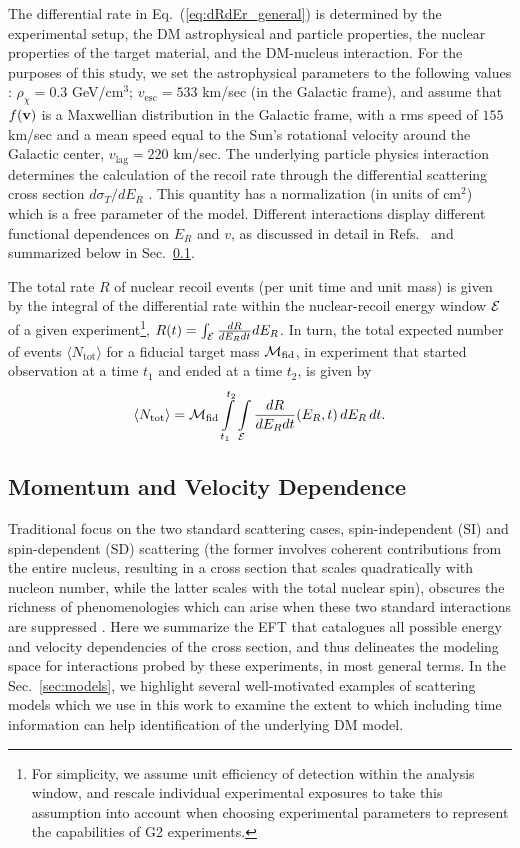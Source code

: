 \documentclass[11pt]{article}
\newcommand{\beq}{\begin{equation}} \newcommand{\eeq}{\end{equation}}
\newcommand{\Eq}[1]{Eq.~(\ref{#1})} \newcommand{\Eqs}[2]{Eqs.~(\ref{#1}) and (\ref{#2})} \newcommand{\Eqm}[2]{Eqs.~(\ref{#1}) through (\ref{#2})}
\newcommand{\Sec}[1]{Sec.~\ref{#1}} \newcommand{\Secs}[2]{Secs.~\ref{#1} and \ref{#2}} \newcommand{\Secm}[2]{Secs.~\ref{#1} through \ref{#2}}
\begin{document}
The differential rate in \Eq{eq:dRdEr_general} is determined by the experimental setup, the DM astrophysical and particle properties, the nuclear properties of the target material, and the DM-nucleus interaction. For the purposes of this study, we set the astrophysical parameters to the following values \cite{Bovy:2013raa,Piffl:2013mla}: $\rho_\chi=0.3$ GeV/cm$^3$; $v_{\mathrm{esc}} = 533$ km/sec (in the Galactic frame), and assume that $f(\mathrm{\mbox{\bf{v}}})$ is a Maxwellian distribution in the Galactic frame, with a rms speed of $155$ km/sec and a mean speed equal to the Sun's rotational velocity around the Galactic center, $v_\textrm{lag}=220$ km/sec.
The underlying particle physics interaction determines the calculation of the recoil rate through the differential scattering cross section ${d\sigma_T}/{dE_R}$ \cite{Gluscevic:2015sqa,Gresham:2014vja}. This quantity has a normalization (in units of cm${}^2$) which is a free parameter of the model. Different interactions display different functional dependences on $E_R$ and $v$, as discussed in detail in Refs.~\cite{Gluscevic:2015sqa,Gresham:2014vja} and summarized below in \Sec{subsec:momentum_velocity}.

The total rate $R$ of nuclear recoil events (per unit time and unit mass) is given by the integral of the differential rate within the nuclear-recoil energy window ${\cal E}$ of a given experiment\footnote{For simplicity, we assume unit efficiency of detection within the analysis window, and rescale individual experimental exposures to take this assumption into account when choosing experimental parameters to represent the capabilities of G2 experiments.}, $R(t)=\int_{\cal E} \frac{dR}{dE_R dt} dE_R$. In turn, the total expected number of events $\langle N_\mathrm{tot}\rangle$ for a fiducial target mass ${\cal M}_\textrm{fid}$, in experiment that started observation at a time $t_1$ and ended at a time $t_2$, is given by
\beq \label{eq:totevents}
\langle N_\mathrm{tot}\rangle =  \cM_\textrm{fid} \int\limits_{t_1}^{t_2} \int\limits_\cE  \frac{dR}{dE_R dt}(E_R,t)\,dE_R \,dt.
\eeq


\subsection{Momentum and Velocity Dependence}
\label{subsec:momentum_velocity}

Traditional focus on the two standard scattering cases, spin-independent (SI) and spin-dependent (SD) scattering (the former involves coherent contributions from the entire nucleus, resulting in a cross section that scales quadratically with nucleon number, while the latter scales with the total nuclear spin), obscures the richness of phenomenologies which can arise when these two standard interactions are suppressed \cite{Fitzpatrick:2012ix,Gresham:2014vja}. Here we summarize the EFT that catalogues all possible energy and velocity dependencies of the cross section, and thus delineates the modeling space for interactions probed by these experiments, in most general terms. In the \Sec{sec:models}, we highlight several well-motivated examples of scattering models which we use in this work to examine the extent to which including time information can help identification of the underlying DM model.
\end{document}
